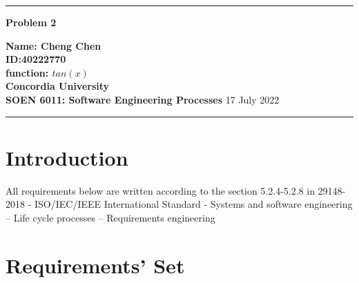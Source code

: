 \documentclass[10pt,a4paper,twoside]{article}
\begin{document}
\begin{center}
\hrule

\vspace{.4cm}
{\bf {\Huge Problem 2}}
\vspace{.2cm}
\end{center}
{\bf Name: Cheng Chen}  \\
{\bf ID:40222770}\\
{\bf function: $tan(x)$}\\
{\bf Concordia University}\\
{\bf SOEN 6011: Software Engineering Processes} {\bf  } \hspace{\fill}   17 July  2022 \\
\hrule






\section{Introduction}
    All requirements below are written according to the section 5.2.4-5.2.8 in 29148-2018 - ISO/IEC/IEEE International Standard - Systems and software engineering -- Life cycle processes -- Requirements engineering\cite{8559686}
\section{Requirements' Set}
\end{document}
